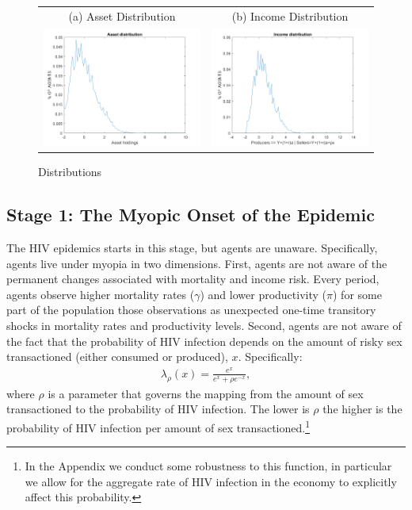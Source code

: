 \begin{figure}[H]
\caption{Distributions}
\hspace{-2.0cm}
\begin{center}
\begin{tabular}{cc}
\multicolumn{1}{c}{(a) Asset Distribution} &
\multicolumn{1}{c}{(b) Income Distribution} \\
\includegraphics[angle=0,width=.5\textwidth]{figures/FIG9.png}   &
\includegraphics[angle=0,width=.5\textwidth]{figures/FIG10.png}
\end{tabular}
\end{center}
\label{fig:4}
\end{figure}


\clearpage
\subsection*{\sf \textbf{Stage 1: The Myopic Onset of the Epidemic}}\label{sec:stage2}
The HIV epidemics starts in this stage, but agents are unaware. Specifically, agents live under myopia in two dimensions. First, agents are not aware of the permanent changes associated with mortality and income risk. Every period, agents observe higher mortality rates ($\gamma$) and lower productivity ($\pi$) for some part of the population  those observations as unexpected one-time transitory shocks in mortality rates and productivity levels. Second, agents are not aware of the fact that the probability of HIV infection depends on the amount of risky sex transactioned (either consumed or produced), $x$. Specifically:
\begin{align}\label{eq:HIV-Infection-Individual}
    \lambda_\rho(x)=\frac{e^{x}}{e^{x}+\rho e^{-x}},
\end{align}
where $\rho$ is a parameter that governs the mapping from the amount of sex transactioned to the probability of HIV infection. The lower is $\rho$ the higher is the probability of HIV infection per amount of sex transactioned.\footnote{\sf In the Appendix we conduct some robustness to this function, in particular we allow for the aggregate rate of HIV infection in the economy to explicitly affect this probability.}

